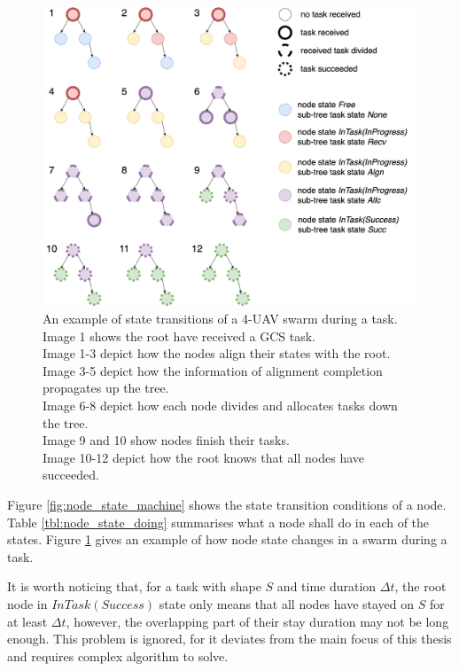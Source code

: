 \begin{figure}[htbp]
  \centering
  \includegraphics[width=0.9\linewidth]{rsc/task_state_transition.png}
  \caption[An example of state transitions of a swarm.]
  {An example of state transitions of a 4-UAV swarm during a task. \\
  Image 1 shows the root have received a GCS task. \\
  Image 1-3 depict how the nodes align their states with the root. \\
  Image 3-5 depict how the information of alignment completion propagates up the tree. \\
  Image 6-8 depict how each node divides and allocates tasks down the tree. \\
  Image 9 and 10 show nodes finish their tasks. \\
  Image 10-12 depict how the root knows that all nodes have succeeded.
  }
  \label{fig:swarm_state_transition}
\end{figure}

Figure \ref{fig:node_state_machine} shows the state transition conditions of a node.
Table \ref{tbl:node_state_doing} summarises what a node shall do in each of the states.
Figure \ref{fig:swarm_state_transition} gives an example of
how node state changes in a swarm during a task.

It is worth noticing that, for a task with shape $S$ and time duration $\Delta t$,
the root node in $InTask(Success)$ state only means that
all nodes have stayed on $S$ for at least $\Delta t$,
however, the overlapping part of their stay duration may not be long enough.
This problem is ignored,
for it deviates from the main focus of this thesis and requires complex algorithm to solve.

